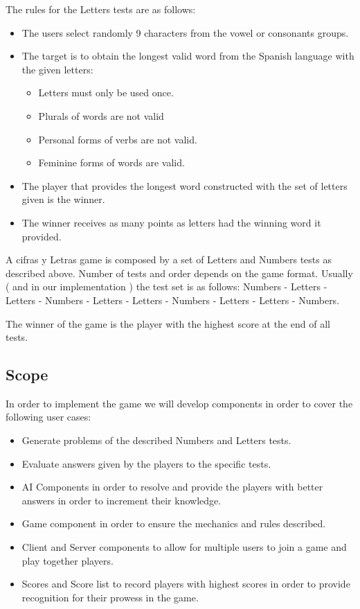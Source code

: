 \documentclass[a4paper,10pt,titlepage]{article}
\begin{document}
\par The rules for the Letters tests are as follows:
\begin{itemize}
	\item The users select randomly 9 characters from the vowel or consonants groups.
	\item The target is to obtain the longest valid word from the Spanish language with the given letters:
	\begin{itemize}
		\item Letters must only be used once.
		\item Plurals of words are not valid
		\item Personal forms of verbs are not valid.
		\item Feminine forms of words are valid.
	\end{itemize}
	\item The player that provides the longest word constructed with the set of letters given is the winner.
	\item The winner receives as many points as letters had the winning word it provided. 
	
\end{itemize}

\par A cifras y Letras game is composed by a set of Letters and Numbers tests as described above. Number of tests and order depends on the game format. Usually ( and in our implementation ) the test set is as follows: Numbers - Letters - Letters - Numbers - Letters - Letters - Numbers - Letters - Letters - Numbers.

\par The winner of the game is the player with the highest score at the end of all tests. 

\subsection{Scope}

\par In order to implement the game we will develop components in order to cover the following user cases:

\begin{itemize}
	\item Generate problems of the described Numbers and Letters tests.
	\item Evaluate answers given by the players to the specific tests.
	\item AI Components in order to resolve and provide the players with better answers in order to increment their knowledge.
	\item Game component in order to ensure the mechanics and rules described.
	\item Client and Server components to allow for multiple users to join a game and play together
 players.
 	\item Scores and Score list to record players with highest scores in order to provide recognition for their prowess in the game. 
\end{itemize}
\end{document}
